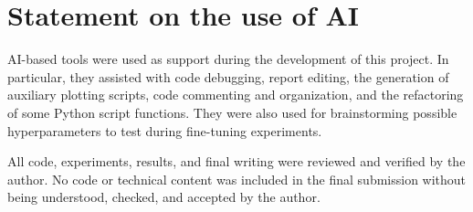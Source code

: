 \documentclass{article}
\begin{document}
\section{Statement on the use of AI}
AI-based tools were used as support during the development of this project.
In particular, they assisted with code debugging, report editing, the generation
of auxiliary plotting scripts, code commenting and organization, and the
refactoring of some Python script functions. They were also used for
brainstorming possible hyperparameters to test during fine-tuning experiments.

All code, experiments, results, and final writing were reviewed and verified by
the author. No code or technical content was included in the final submission
without being understood, checked, and accepted by the author.



\end{document}
